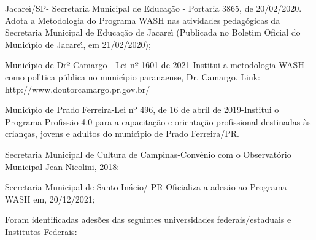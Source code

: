 \documentclass[
12pt,		%
openright,	%
twoside,  %
a4paper,			%
chapter=TITLE,		%
english,			%
french,				%
spanish,			%
brazil				%
]{USPSC-classe/USPSC}
\begin{document}
\begin{alineas}
\item Jacare\'{\i}/SP- Secretaria Municipal de Educa\c{c}\~ao - Portaria 3865, de 20/02/2020. Adota a Metodologia do Programa WASH nas atividades pedag\'ogicas da Secretaria Municipal de Educa\c{c}\~ao de Jacare\'{\i} (Publicada no Boletim Oficial do Munic\'{\i}pio de Jacare\'{\i}, em 21/02/2020);
\item Munic\'{\i}pio de Drº Camargo - Lei nº 1601 de 2021-Institui a metodologia WASH como pol\'{\i}tica p\'ublica no munic\'{\i}pio paranaense, Dr. Camargo. Link: http://www.doutorcamargo.pr.gov.br/
\item Munic\'{\i}pio de Prado Ferreira-Lei nº 496, de 16 de abril de 2019-Institui o Programa Profiss\~ao 4.0 para a capacita\c{c}\~ao e orienta\c{c}\~ao profissional destinadas \`as crian\c{c}as, jovens e adultos do munic\'{\i}pio de Prado Ferreira/PR.
\item Secretaria Municipal de Cultura de Campinas-Conv\^enio com o Observat\'orio Municipal Jean Nicolini, 2018:
\item Secretaria Municipal de Santo In\'acio/ PR-Oficializa a ades\~ao ao Programa WASH em, 20/12/2021;
\end{alineas}

Foram identificadas ades\~oes das seguintes universidades federais/estaduais e Institutos Federais:
\end{document}
